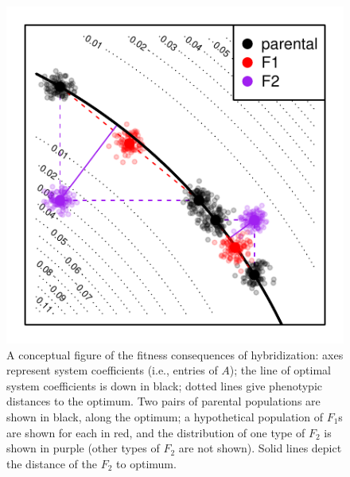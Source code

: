 \documentclass{article}
\newcommand{\1}{\mathbbm{1}}
\begin{document}
\begin{figure}[H]
\centering
\includegraphics{figures/conceptual_fig}
\caption{
    \label{fig:conceptual_fig}
    A conceptual figure of the fitness consequences of hybridization:
    axes represent system coefficients (i.e., entries of $A$);
    the line of optimal system coefficients is down in black;
    dotted lines give phenotypic distances to the optimum.
    Two pairs of parental populations are shown in black, along the optimum;
    a hypothetical population of $F_1$s are shown for each in red,
    and the distribution of one type of $F_2$ is shown in purple
    (other types of $F_2$ are not shown).
    Solid lines depict the distance of the $F_2$ to optimum.
}
\end{figure}
\end{document}
